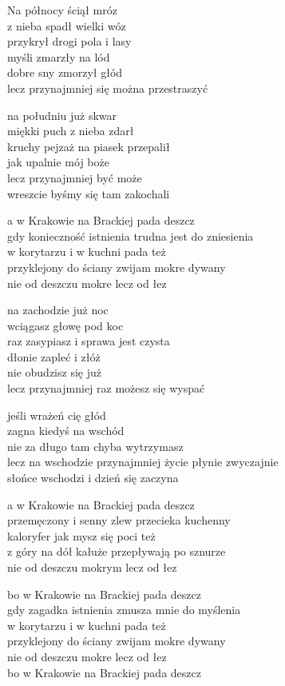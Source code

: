 \begin{text}

    Na północy ściął mróz\\
    z nieba spadł wielki wóz\\
    przykrył drogi pola i lasy\\
    myśli zmarzły na lód\\
    dobre sny zmorzył głód\\
    lecz przynajmniej się można przestraszyć

    na południu już skwar\\
    miękki puch z nieba zdarł\\
    kruchy pejzaż na piasek przepalił\\
    jak upalnie mój boże\\
    lecz przynajmniej być może\\
    wreszcie byśmy się tam zakochali

    a w Krakowie na Brackiej pada deszcz\\
    gdy konieczność istnienia trudna jest do zniesienia\\
    w korytarzu i w kuchni pada też\\
    przyklejony do ściany zwijam mokre dywany\\
    nie od deszczu mokre lecz od łez

    na zachodzie już noc\\
    wciągasz głowę pod koc\\
    raz zasypiasz i sprawa jest czysta\\
    dłonie zapleć i złóż\\
    nie obudzisz się już\\
    lecz przynajmniej raz możesz się wyspać

    jeśli wrażeń cię głód\\
    zagna kiedyś na wschód\\
    nie za długo tam chyba wytrzymasz\\
    lecz na wschodzie przynajmniej życie płynie zwyczajnie\\
    słońce wschodzi i dzień się zaczyna

    a w Krakowie na Brackiej pada deszcz\\
    przemęczony i senny zlew przecieka kuchenny\\
    kaloryfer jak mysz się poci też\\
    z góry na dół kałuże przepływają po sznurze\\
    nie od deszczu mokrym lecz od łez

    bo w Krakowie na Brackiej pada deszcz\\
    gdy zagadka istnienia zmusza mnie do myślenia\\
    w korytarzu i w kuchni pada też\\
    przyklejony do ściany zwijam mokre dywany\\
    nie od deszczu mokre lecz od łez\\
    bo w Krakowie na Brackiej pada deszcz
    
\end{text}

